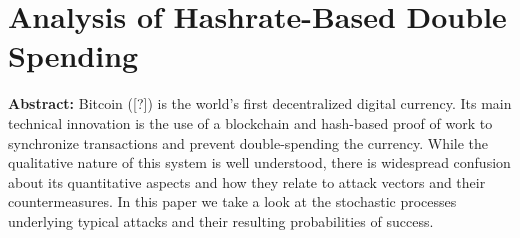 \section{Analysis of Hashrate-Based Double Spending }

\textbf{Abstract:} 
Bitcoin ([?]) is the world’s first decentralized digital currency. Its main technical innovation is the use of a blockchain and hash-based proof of work to synchronize transactions and prevent double-spending the currency. While the qualitative nature of this system is well understood, there is widespread confusion about its quantitative aspects and how they relate to attack vectors and their countermeasures. In this paper we take a look at the stochastic processes underlying typical attacks and their resulting probabilities of success.
